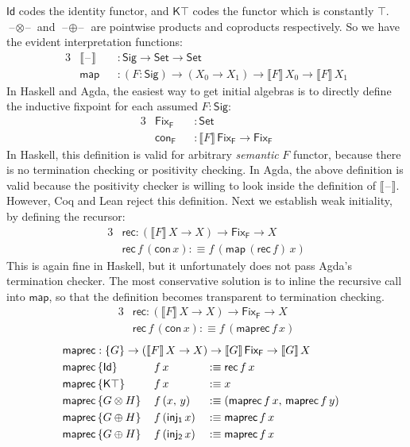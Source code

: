 \documentclass[12pt,a4paper,twoside,openany]{book}
\theoremstyle{remark}
\theoremstyle{definition}
\theoremstyle{theorem}
\newcommand{\ms}[1]{\mathsf{#1}}
\newcommand{\Id}{\mathsf{Id}}
\newcommand{\blank}{\mathord{\hspace{1pt}\text{--}\hspace{1pt}}}
\newcommand{\Set}{\mathsf{Set}}
\newcommand{\defn}{:\equiv}
\begin{document}
$\ms{Id}$ codes the identity functor, and $\ms{K\top}$ codes the functor which
is constantly $\top$. $\blank\!\otimes\!\blank$ and $\blank\!\oplus\!\blank$ are
pointwise products and coproducts respectively. So we have the evident
interpretation functions:
\begin{alignat*}{3}
  & \llbracket\blank\rrbracket &&: \ms{Sig} \to \Set \to \Set\\
  & \ms{map} &&: (F : \ms{Sig}) \to (X_0 \to X_1) \to \llbracket F \rrbracket\,X_0 \to \llbracket F \rrbracket\,X_1
\end{alignat*}
In Haskell and Agda, the easiest way to get initial algebras is to directly define
the inductive fixpoint for each assumed $F : \ms{Sig}$:
\begin{alignat*}{3}
  & \ms{Fix_F} &&: \Set \\
  & \ms{con_F} &&: \llbracket F \rrbracket\,\ms{Fix_F} \to \ms{Fix_F}
\end{alignat*}
In Haskell, this definition is valid for arbitrary \emph{semantic} $F$ functor,
because there is no termination checking or positivity checking. In Agda, the
above definition is valid because the positivity checker is willing to look
inside the definition of $\llbracket\blank\rrbracket$. However, Coq and Lean
reject this definition. Next we establish weak initiality, by defining the
recursor:
\begin{alignat*}{3}
  & \ms{rec} : (\llbracket F \rrbracket\,X \to X) \to \ms{Fix_F} \to X \\
  & \ms{rec}\,f\,(\ms{con}\,x) \defn f\,(\ms{map}\,(\ms{rec}\,f)\,x)
\end{alignat*}
This is again fine in Haskell, but it unfortunately does not pass Agda's
termination checker. The most conservative solution is to inline the recursive
call into $\ms{map}$, so that the definition becomes transparent to termination
checking.
\begin{alignat*}{3}
  &\ms{rec} : (\llbracket F \rrbracket\,X \to X) \to \ms{Fix_F} \to X\\
  &\ms{rec}\,f\,(\ms{con}\,x) \defn f\,(\ms{maprec}\,f\,x)
\end{alignat*}
\begin{alignat*}{3}
  & \rlap{$\ms{maprec} : \{G\} \to (\llbracket F \rrbracket\,X \to X) \to \llbracket G \rrbracket\,\ms{Fix_F} \to \llbracket G \rrbracket\,X$}\\
  & \ms{maprec}\,\{\Id\}\,&&f\,x &&\defn \ms{rec}\,f\,x\\
  & \ms{maprec}\,\{\ms{K\top}\}\,&&f\,x &&\defn x\\
  & \ms{maprec}\,\{G \otimes H\}\,&&f\,(x,\,y) &&\defn  (\ms{maprec}\,f\,x,\,\ms{maprec}\,f\,y)\\
  & \ms{maprec}\,\{G \oplus H\}\,&&f\,(\ms{inj_1}\,x) &&\defn \ms{maprec}\,f\,x\\
  & \ms{maprec}\,\{G \oplus H\}\,&&f\,(\ms{inj_2}\,x) &&\defn \ms{maprec}\,f\,x
\end{alignat*}
\end{document}
